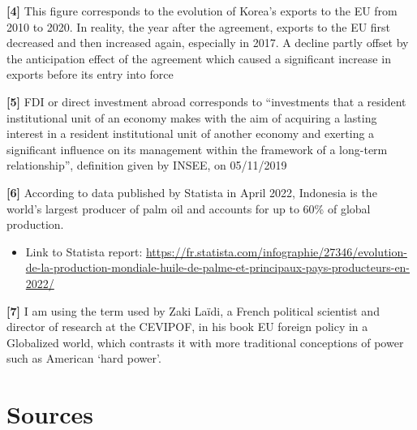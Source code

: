 \documentclass[11pt,a4paper]{article}
\begin{document}
\textbf{{[}4{]}} This figure corresponds to the evolution of Korea’s exports to the EU from 2010 to 2020. In reality, the year after the agreement, exports to the EU first decreased and then increased again, especially in 2017. A decline partly offset by the anticipation effect of the agreement which caused a significant increase in exports before its entry into force

\textbf{{[}5{]}} FDI or direct investment abroad corresponds to “investments that a resident institutional unit of an economy makes with the aim of acquiring a lasting interest in a resident institutional unit of another economy and exerting a significant influence on its management within the framework of a long-term relationship”, definition given by INSEE, on 05/11/2019

\textbf{{[}6{]}} According to data published by Statista in April 2022, Indonesia is the world’s largest producer of palm oil and accounts for up to 60\% of global production.
\begin{itemize}
  \item Link to Statista report: \url{https://fr.statista.com/infographie/27346/evolution-de-la-production-mondiale-huile-de-palme-et-principaux-pays-producteurs-en-2022/}
\end{itemize}

\textbf{{[}7{]}} I am using the term used by Zaki Laïdi, a French political scientist and director of research at the CEVIPOF, in his book EU foreign policy in a Globalized world, which contrasts it with more traditional conceptions of power such as American ‘hard power’.

\section{Sources}
\small
\end{document}
